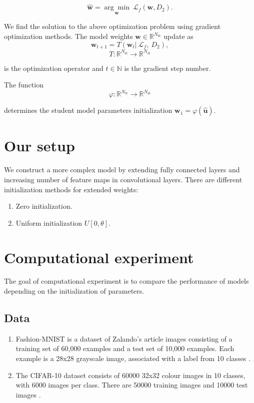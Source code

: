 \documentclass[80pt]{article}
\begin{document}
$$\hat{\mathbf{w}} =  \underset{\mathbf{w}}{\arg\min}~\mathcal{L}_f(\mathbf{w}, D_2).$$

We find the solution to the above optimization problem using gradient optimization methods. The model weights $\mathbf{w} \in \mathbb{R}^{N_{\text{st}}}$ update as
\[\mathbf{w}_{t+1} = T(\mathbf{w}_t |~\mathcal{L}_f,~D_2),\]
\[T: \mathbb{R}^{N_\text{st}} \rightarrow \mathbb{R}^{N_\text{st}}\]

is the optimization operator and $t \in \mathbb{N}$ is the gradient step number.

The function 
\[\varphi: \mathbb{R}^{N_\text{tr}} \rightarrow \mathbb{R}^{N_\text{st}}\]

determines the student model parameters initialization $\mathbf{w}_1 = \varphi(\hat{\mathbf{u}})$.

\section{Our setup}

We construct a more complex model by extending fully connected layers and increasing number of feature maps in convolutional layers. There are different initialization methods for extended weights:

\begin{enumerate}
    \item Zero initialization.
    \item Uniform initialization $U[0, \theta]$.
\end{enumerate}

\section{Computational experiment}

The goal of computational experiment is to compare the performance of models depending on the initialization of parameters. 

\subsection{Data}

\begin{enumerate}
    \item Fashion-MNIST is a dataset of Zalando's article images consisting of a training set of 60,000 examples and a test set of 10,000 examples. Each example is a 28x28 grayscale image, associated with a label from 10 classes  \citep{fashionmnist}.
    
    \item The CIFAR-10 dataset consists of 60000 32x32 colour images in 10 classes, with 6000 images per class. There are 50000 training images and 10000 test images \citep{cifar10}.
\end{enumerate}
\end{document}
